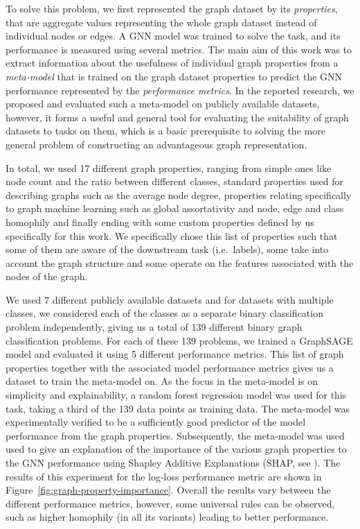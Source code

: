 To solve this problem, we first represented the graph dataset by its \emph{properties}, that are aggregate values representing the whole graph dataset instead of individual nodes or edges. A GNN model \cite{hamilton_inductive_2017} was trained to solve the task, and its performance is measured using several metrics. The main aim of this work was to extract information about the usefulness of individual graph properties from a \emph{meta-model} that is trained on the graph dataset properties to predict the GNN performance represented by the \emph{performance metrics}.
In the reported research, we proposed and evaluated such a meta-model on publicly available datasets, however, it forms a useful and general tool for evaluating the suitability of graph datasets to tasks on them, which is a basic prerequisite to solving the more general problem of constructing an advantageous graph representation.

In total, we used 17 different graph properties, ranging from simple ones like node count and the ratio between different classes, standard properties used for describing graphs such as the average node degree, properties relating specifically to graph machine learning such as global assortativity and node, edge and class homophily and finally ending with some custom properties defined by us specifically for this work. We specifically chose this list of properties such that some of them are aware of the downstream task (i.e.\ labels), some take into account the graph structure and some operate on the features associated with the nodes of the graph.

We used 7 different publicly available datasets and for datasets with multiple classes, we considered each of the classes as a separate binary classification problem independently, giving us a total of 139 different binary graph classification problems. For each of these 139 problems, we trained a GraphSAGE model and evaluated it using 5 different performance metrics. This list of graph properties together with the associated model performance metrics gives us a dataset to train the meta-model on. As the focus in the meta-model is on simplicity and explainability, a random forest regression model was used for this task, taking a third of the 139 data points as training data. The meta-model was experimentally verified to be a sufficiently good predictor of the model performance from the graph properties. Subsequently, the meta-model was used used to give an explanation of the importance of the various graph properties to the GNN performance using Shapley Additive Explanations (SHAP, see \cite{shapley_notes_1951}). The results of this experiment for the log-loss performance metric are shown in Figure~\ref{fig:graph-property-importance}. Overall the results vary between the different performance metrics, however, some universal rules can be observed, such as higher homophily (in all its variants) leading to better performance.

